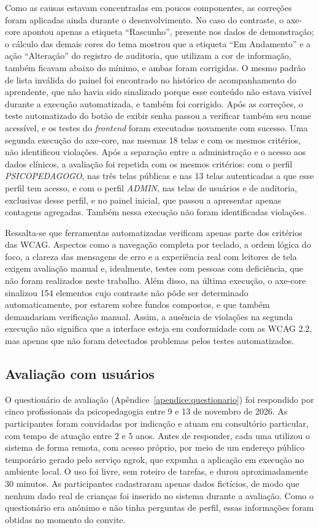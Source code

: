 Como as causas estavam concentradas em poucos componentes, as correções foram aplicadas ainda durante o desenvolvimento. No caso do contraste, o axe-core apontou apenas a etiqueta ``Rascunho'', presente nos dados de demonstração; o cálculo das demais cores do tema mostrou que a etiqueta ``Em Andamento'' e a ação ``Alteração'' do registro de auditoria, que utilizam a cor de informação, também ficavam abaixo do mínimo, e ambas foram corrigidas. O mesmo padrão de lista inválida do painel foi encontrado no histórico de acompanhamento do aprendente, que não havia sido sinalizado porque esse conteúdo não estava visível durante a execução automatizada, e também foi corrigido. Após as correções, o teste automatizado do botão de exibir senha passou a verificar também seu nome acessível, e os testes do \textit{frontend} foram executados novamente com sucesso. Uma segunda execução do axe-core, nas mesmas 18 telas e com os mesmos critérios, não identificou violações. Após a separação entre a administração e o acesso aos dados clínicos, a avaliação foi repetida com os mesmos critérios: com o perfil \textit{PSICOPEDAGOGO}, nas três telas públicas e nas 13 telas autenticadas a que esse perfil tem acesso, e com o perfil \textit{ADMIN}, nas telas de usuários e de auditoria, exclusivas desse perfil, e no painel inicial, que passou a apresentar apenas contagens agregadas. Também nessa execução não foram identificadas violações.

Ressalta-se que ferramentas automatizadas verificam apenas parte dos critérios das WCAG. Aspectos como a navegação completa por teclado, a ordem lógica do foco, a clareza das mensagens de erro e a experiência real com leitores de tela exigem avaliação manual e, idealmente, testes com pessoas com deficiência, que não foram realizados neste trabalho. Além disso, na última execução, o axe-core sinalizou 154 elementos cujo contraste não pôde ser determinado automaticamente, por estarem sobre fundos compostos, e que também demandariam verificação manual. Assim, a ausência de violações na segunda execução não significa que a interface esteja em conformidade com as WCAG 2.2, mas apenas que não foram detectados problemas pelos testes automatizados.

\subsection{Avaliação com usuários}\label{sec:avaliacao_usuarios}

O questionário de avaliação (Apêndice~\ref{apendice:questionario}) foi respondido por cinco profissionais da psicopedagogia entre 9 e 13 de novembro de 2026. As participantes foram convidadas por indicação e atuam em consultório particular, com tempo de atuação entre 2 e 5 anos. Antes de responder, cada uma utilizou o sistema de forma remota, com acesso próprio, por meio de um endereço público temporário gerado pelo serviço ngrok, que expunha a aplicação em execução no ambiente local. O uso foi livre, sem roteiro de tarefas, e durou aproximadamente 30 minutos. As participantes cadastraram apenas dados fictícios, de modo que nenhum dado real de crianças foi inserido no sistema durante a avaliação. Como o questionário era anônimo e não tinha perguntas de perfil, essas informações foram obtidas no momento do convite.

